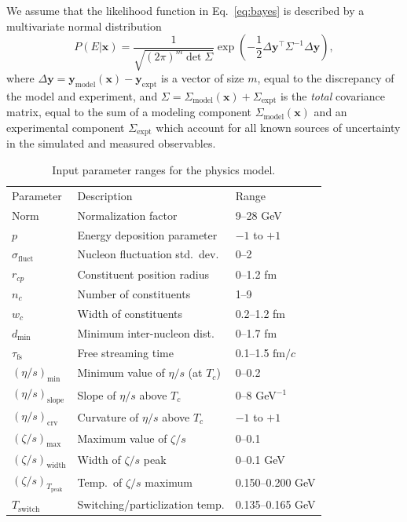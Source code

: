 \documentclass[aps,prc,reprint,amsmath,nofootinbib]{revtex4-1}
\newcommand{\fmc}{\ensuremath{\text{fm}/c}}
\newcommand{\sigmaf}{\sigma_\text{fluct}}
\newcommand{\taufs}{\tau_\text{fs}}
\newcommand{\dmin}{d_\text{min}}
\newcommand{\Tsw}{T_\text{switch}}
\newcommand{\Tc}{T_c}
\newcommand{\rc}{r_{cp}}
\newcommand{\nc}{n_c}
\newcommand{\wc}{w_c}
\newcommand{\smin}{{(\eta/s)_\mathrm{min}}}
\newcommand{\sslope}{{(\eta/s)_\mathrm{slope}}}
\newcommand{\scrv}{{(\eta/s)_\mathrm{crv}}}
\newcommand{\bmax}{{(\zeta/s)_\mathrm{max}}}
\newcommand{\bwidth}{{(\zeta/s)_\mathrm{width}}}
\newcommand{\bloc}{{(\zeta/s)_{T_\mathrm{peak}}}}
\newcommand{\xv}{\mathbf x}
\newcommand{\yv}{\mathbf y}
\newcommand{\ym}{{\mathbf y}_\text{model}}
\newcommand{\ye}{{\mathbf y}_\text{expt}}
\newcommand{\Sigmam}{\Sigma_\text{model}}
\newcommand{\Sigmae}{\Sigma_\text{expt}}
\newcommand{\paddedhline}{\noalign{\smallskip}\hline\noalign{\smallskip}}
\begin{document}
We assume that the likelihood function in Eq.~\eqref{eq:bayes} is described by a multivariate normal distribution
\begin{equation}
  \label{eq:likelihood}
  P(E | \xv) = \frac{1}{\sqrt{(2\pi)^m \det \Sigma}} \exp \left ( -\frac{1}{2}\Delta\yv^\intercal \Sigma^{-1} \Delta\yv \right ),
\end{equation}
where $\Delta\yv = \ym(\xv) - \ye$ is a vector of size $m$, equal to the discrepancy of the model and experiment, and $\Sigma = \Sigmam(\xv) + \Sigmae$ is the \emph{total} covariance matrix, equal to the sum of a modeling component $\Sigmam(\xv)$ and an experimental component $\Sigmae$ which account for all known sources of uncertainty in the simulated and measured observables.

\begin{table}[t]
  \caption{
    \label{tab:design}
    Input parameter ranges for the physics model.
  }
  \begin{ruledtabular}
  \begin{tabular}{lll}
    Parameter         & Description                          & Range            \\
    \paddedhline
    Norm              & Normalization factor                 & 9--28 GeV        \\
    $p$               & Energy deposition parameter          & $-1$ to $+1$     \\
    $\sigmaf$         & Nucleon fluctuation std.\ dev.\      & 0--2             \\
    $\rc$             & Constituent position radius          & 0--1.2 fm        \\
    $\nc$             & Number of constituents               & 1--9             \\
    $\wc$             & Width of constituents                & 0.2--1.2 fm      \\
    $\dmin$           & Minimum inter-nucleon dist.\         & 0--1.7 fm        \\
    $\taufs$          & Free streaming time                  & 0.1--1.5 \fmc    \\
    $\smin$           & Minimum value of $\eta/s$ (at $\Tc$) & 0--0.2           \\
    $\sslope$         & Slope of $\eta/s$ above $\Tc$        & 0--8 GeV$^{-1}$  \\
    $\scrv$           & Curvature of $\eta/s$ above $\Tc$    & $-1$ to $+1$     \\
    $\bmax$           & Maximum value of $\zeta/s$           & 0--0.1           \\
    $\bwidth$         & Width of $\zeta/s$ peak              & 0--0.1 GeV       \\
    $\bloc$           & Temp.\ of $\zeta/s$ maximum          & 0.150--0.200 GeV \\
    $\Tsw$            & Switching/particlization temp.       & 0.135--0.165 GeV \\
  \end{tabular}
  \end{ruledtabular}
\end{table}
\end{document}
